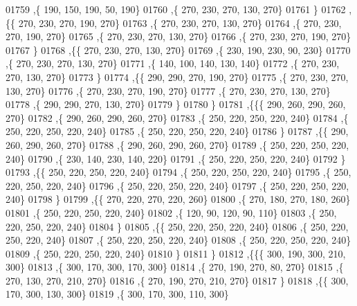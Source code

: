 \begin{DoxyCode}
01759     ,\{   190,   150,   190,    50,   190\}
01760     ,\{   270,   230,   270,   130,   270\}
01761     \}
01762    ,\{\{   270,   230,   270,   190,   270\}
01763     ,\{   270,   230,   270,   130,   270\}
01764     ,\{   270,   230,   270,   190,   270\}
01765     ,\{   270,   230,   270,   130,   270\}
01766     ,\{   270,   230,   270,   190,   270\}
01767     \}
01768    ,\{\{   270,   230,   270,   130,   270\}
01769     ,\{   230,   190,   230,    90,   230\}
01770     ,\{   270,   230,   270,   130,   270\}
01771     ,\{   140,   100,   140,   130,   140\}
01772     ,\{   270,   230,   270,   130,   270\}
01773     \}
01774    ,\{\{   290,   290,   270,   190,   270\}
01775     ,\{   270,   230,   270,   130,   270\}
01776     ,\{   270,   230,   270,   190,   270\}
01777     ,\{   270,   230,   270,   130,   270\}
01778     ,\{   290,   290,   270,   130,   270\}
01779     \}
01780    \}
01781   ,\{\{\{   290,   260,   290,   260,   270\}
01782     ,\{   290,   260,   290,   260,   270\}
01783     ,\{   250,   220,   250,   220,   240\}
01784     ,\{   250,   220,   250,   220,   240\}
01785     ,\{   250,   220,   250,   220,   240\}
01786     \}
01787    ,\{\{   290,   260,   290,   260,   270\}
01788     ,\{   290,   260,   290,   260,   270\}
01789     ,\{   250,   220,   250,   220,   240\}
01790     ,\{   230,   140,   230,   140,   220\}
01791     ,\{   250,   220,   250,   220,   240\}
01792     \}
01793    ,\{\{   250,   220,   250,   220,   240\}
01794     ,\{   250,   220,   250,   220,   240\}
01795     ,\{   250,   220,   250,   220,   240\}
01796     ,\{   250,   220,   250,   220,   240\}
01797     ,\{   250,   220,   250,   220,   240\}
01798     \}
01799    ,\{\{   270,   220,   270,   220,   260\}
01800     ,\{   270,   180,   270,   180,   260\}
01801     ,\{   250,   220,   250,   220,   240\}
01802     ,\{   120,    90,   120,    90,   110\}
01803     ,\{   250,   220,   250,   220,   240\}
01804     \}
01805    ,\{\{   250,   220,   250,   220,   240\}
01806     ,\{   250,   220,   250,   220,   240\}
01807     ,\{   250,   220,   250,   220,   240\}
01808     ,\{   250,   220,   250,   220,   240\}
01809     ,\{   250,   220,   250,   220,   240\}
01810     \}
01811    \}
01812   ,\{\{\{   300,   190,   300,   210,   300\}
01813     ,\{   300,   170,   300,   170,   300\}
01814     ,\{   270,   190,   270,    80,   270\}
01815     ,\{   270,   130,   270,   210,   270\}
01816     ,\{   270,   190,   270,   210,   270\}
01817     \}
01818    ,\{\{   300,   170,   300,   130,   300\}
01819     ,\{   300,   170,   300,   110,   300\}

\end{DoxyCode}
